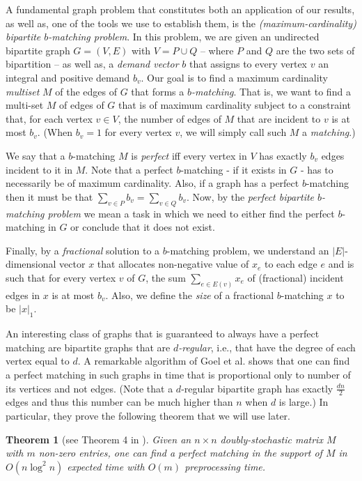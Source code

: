 \documentclass[11pt, letterpaper]{article}
\newtheorem{theorem}{Theorem}[section]
\newcommand{\onorm}[1]{|#1|_{1}}
\newcommand{\bb}{\boldsymbol{\mathit{b}}}
\newcommand{\xx}{\boldsymbol{\mathit{x}}}
\newcommand{\MM}{\boldsymbol{\mathit{M}}}
\begin{document}
A fundamental graph problem that constitutes both an application of our results, as well as, one of the tools we use to establish them, is the {\em (maximum-cardinality) bipartite $\bb$-matching problem}. In this problem, we are given an undirected bipartite graph $G=(V,E)$ with $V=P\cup Q$ -- where $P$ and $Q$ are the two sets of bipartition -- as well as, a \emph{demand vector} $\bb$ that assigns to every vertex $v$ an integral and positive demand $b_v$. Our goal is to find a maximum cardinality \emph{multiset} $M$ of the edges of $G$ that forms a {\em $\bb$-matching}. That is, we want to find a multi-set $M$ of edges of $G$ that is of maximum cardinality subject to a constraint that, for each vertex $v\in V$, the number of edges of $M$ that are incident to $v$ is at most $b_v$. (When $b_v=1$ for every vertex $v$, we will simply call such $M$ a \emph{matching}.)

 We say that a $\bb$-matching $M$ is \emph{perfect} iff every vertex in $V$ has exactly $b_v$ edges incident to it in $M$. Note that a perfect $\bb$-matching - if it exists in $G$ - has to necessarily be of maximum cardinality. Also, if a graph has a perfect $\bb$-matching then it must be that $\sum_{v\in P} b_v=\sum_{v\in Q} b_v$. Now, by the {\em perfect bipartite $\bb$-matching problem} we mean a task in which we need to either find the perfect $\bb$-matching in $G$ or conclude that it does not exist. 
 
 Finally, by a {\em fractional} solution to a $\bb$-matching problem, we understand an $|E|$-dimensional vector $\xx$ that allocates non-negative value of $x_e$ to each edge $e$ and is such that for every vertex $v$ of $G$, the sum $\sum_{e\in E(v)} x_e$ of (fractional) incident edges in $\xx$ is at most $b_v$. Also, we define the {\em size} of a fractional $\bb$-matching $\xx$  to be $\onorm{\xx}$.

An interesting class of graphs that is guaranteed to always have a perfect matching are bipartite graphs that are \emph{$d$-regular}, i.e., that have the degree of each vertex equal to $d$. A remarkable algorithm of Goel et al. \cite{GoelKK10} shows that one can find a perfect matching in such graphs in time that is proportional only to number of its vertices and not edges. (Note that a $d$-regular bipartite graph has exactly $\frac{dn}{2}$ edges and thus this number can be much higher than $n$ when $d$ is large.) In particular, they prove the following theorem that we will use later. 

\begin{theorem}[see Theorem 4 in \cite{GoelKK10}]\label{thm:regular_bipartite_matchings}
Given an $n\times n$ doubly-stochastic matrix $\MM$ with $m$ non-zero entries, one can find a perfect matching in the support of $M$ in $O(n\log^2 n)$ expected time with $O(m)$ preprocessing time.
\end{theorem}
\end{document}
